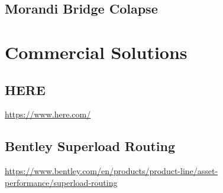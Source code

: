 \subsection{Morandi Bridge Colapse}

\citet{Morgese.2020}
\citet{MorandiNYTimes}


\section{Commercial Solutions}

\subsection{HERE}
\url{https://www.here.com/}

\subsection{Bentley Superload Routing}
\url{https://www.bentley.com/en/products/product-line/asset-performance/superload-routing}
